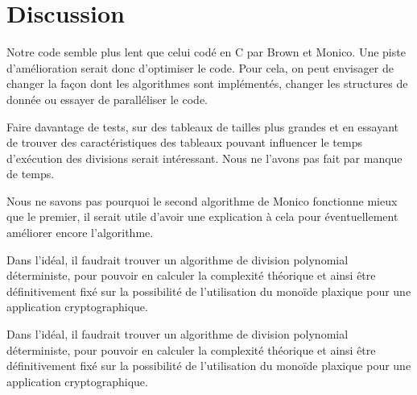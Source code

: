 \section{Discussion}
Notre code semble plus lent que celui codé en C par Brown et Monico. Une piste d'amélioration serait donc d'optimiser le code. Pour cela, on peut envisager de changer la façon dont les algorithmes sont implémentés, changer les structures de donnée ou essayer de paralléliser le code. 

Faire davantage de tests, sur des tableaux de tailles plus grandes et en essayant de trouver des caractéristiques des tableaux pouvant influencer le temps d'exécution des divisions serait intéressant. Nous ne l'avons pas fait par manque de temps.

Nous ne savons pas pourquoi le second algorithme de Monico fonctionne mieux que le premier, il serait utile d'avoir une explication à cela pour éventuellement améliorer encore l'algorithme.

Dans l'idéal, il faudrait trouver un algorithme de division polynomial déterministe, pour pouvoir en calculer la complexité théorique et ainsi être définitivement fixé sur la possibilité de l'utilisation du monoïde plaxique pour une application cryptographique.

Dans l'idéal, il faudrait trouver un algorithme de division polynomial déterministe, pour pouvoir en calculer la complexité théorique et ainsi être définitivement fixé sur la possibilité de l'utilisation du monoïde plaxique pour une application cryptographique.